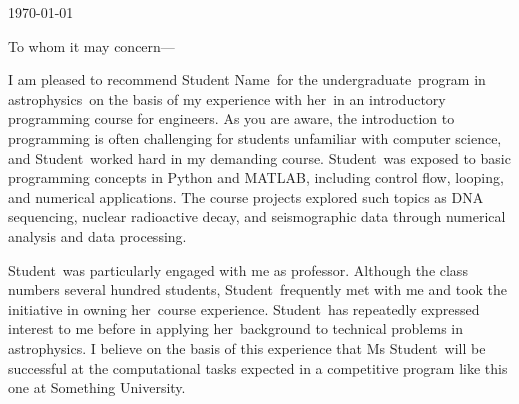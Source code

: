 \documentclass[12pt]{article}
\providecommand\studentname{Student Name}
\providecommand\studentforename{Student}
\providecommand\studentsurname{Ms Student}
\providecommand\studentstanding{undergraduate}
\providecommand\studentapplication{astrophysics}
\providecommand\studenttarget{Something University}
\providecommand\xir{her}
\providecommand\xirs{her}
\begin{document}
\bigskip\bigskip\bigskip\bigskip
\bigskip\bigskip\bigskip\bigskip
\bigskip\bigskip\bigskip\bigskip
\bigskip\bigskip\bigskip\bigskip

\today
\bigskip

To whom it may concern---
\bigskip

I am pleased to recommend \studentname{}~for the \studentstanding{}~program in
\studentapplication{}~on the basis of my experience with \xir{}~in an
introductory programming course for engineers.  As you are aware, the
introduction to programming is often challenging for students unfamiliar with
computer science, and \studentforename{}~worked hard in my demanding course.
\studentforename{}~was exposed to basic programming concepts in Python and
MATLAB, including control flow, looping, and numerical applications.  The
course projects explored such topics as DNA sequencing, nuclear radioactive
decay, and seismographic data through numerical analysis and data processing.

\studentforename{}~was particularly engaged with me as professor.  Although the
class numbers several hundred students, \studentforename{}~frequently met with
me and took the initiative in owning \xirs{}~course experience.
\studentforename{}~has repeatedly expressed interest to me before in applying
\xirs{}~background to technical problems in \studentapplication{}.  I believe
on the basis of this experience that \studentsurname~will be successful at the
computational tasks expected in a competitive program like this one at
\studenttarget{}.
\end{document}

